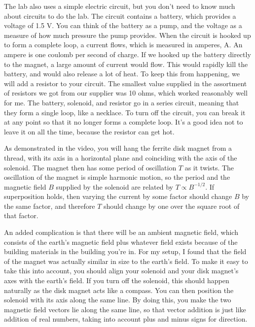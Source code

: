 The lab also uses a simple electric circuit, but you don't need to know much about circuits to do the lab.
The circuit contains a battery, which provides a voltage of 1.5 V. You can think of the battery as a pump, and the
voltage as a measure of how much pressure the pump provides. When the circuit is hooked up to form a complete loop,
a current flows, which is measured in amperes, A. An ampere is one coulomb per second of charge. If we hooked up
the battery directly to the magnet, a large amount of current would flow. This would rapidly kill the battery, and
would also release a lot of heat. To keep this from happening, we will add a resistor to your circuit. The smallest
value supplied in the assortment of resistors we got from our supplier was 10 ohms, which worked reasonably well for me.
The battery, solenoid, and resistor go in a series circuit, meaning that they form a single loop, like a necklace.
To turn off the circuit, you can break it at any point so that it no longer forms a complete loop. It's a good idea
not to leave it on all the time, because the resistor can get hot.

As demonstrated in the video, you will hang the ferrite disk magnet from a thread, with its axis in a horizontal plane
and coinciding with the axis of the solenoid. The magnet then has some period of oscillation $T$ as it twists.
The oscillation of the magnet is simple harmonic motion, so the period and
the magnetic field $B$ supplied by the solenoid are related by $T\propto B^{-1/2}$.
If superposition holds, then varying the current by some factor should change $B$ by the same factor, and therefore
$T$ should change by one over the square root of that factor.

An added complication is that there will be an ambient magnetic field, which consists of the earth's magnetic field
plus whatever field exists because of the building materials in the building you're in. For my setup, I found that
the field of the magnet was actually similar in size to the earth's field. To make it easy to take this into account,
you should align your solenoid and your disk magnet's axes with the earth's field. If you turn off the solenoid, this should
happen naturally as the disk magnet acts like a compass. You can then position the solenoid with its axis along the same line.
By doing this, you make the two magnetic field vectors lie along the same line, so that vector addition is just like addition of
real numbers, taking into account plus and minus signs for direction.


\observations

